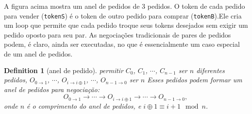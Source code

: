 \documentclass[UTF8,nofonts]{article}
\makeatletter
\newtheorem{definition}{Definition}[section]
\newenvironment{figurehere}
 {\def\@captype{figure}}
 {}
\makeatother
\begin{document}
\begin{multicols}{2}
\begin{center}
\begin{figurehere}

\caption{Um anel de pedidos de 3 Pedidos}
\label{fig:ring}
\end{figurehere}
\end{center}



A figura acima mostra um anel de pedidos de 3 pedidos. O token de cada pedido para vender (\verb|tokenS|) é o token de outro pedido para comprar (\verb|tokenB|).Ele cria um loop que permite que cada pedido troque seus tokens desejados sem exigir um pedido oposto para seu par. As negociações tradicionais de pares de pedidos podem, é claro, ainda ser executadas, no que é essencialmente um caso especial de um anel de pedidos.

\begin{definition}[anel de pedido] permitir $C_{0}$, $C_{1}$, $\cdots$, $C_{n-1}$ ser $n$ diferentes pedidos, $O_{0\rightarrow 1}$, $\cdots$, $O_{i\rightarrow i\oplus 1}$, $\cdots$, $O_{n-1 \rightarrow 0}$ ser $n$ Esses pedidos podem formar um anel de pedidos para negociação:
$$O_{0\rightarrow 1} \rightarrow \cdots \rightarrow O_{i\rightarrow i\oplus 1} \rightarrow \cdots \rightarrow O_{n-1\rightarrow 0} \text{, }$$
onde $n$ é o comprimento do anel de pedidos, e $i\oplus 1 \equiv i+1 \mod n$.
\end{definition}


\end{multicols}
\end{document}
